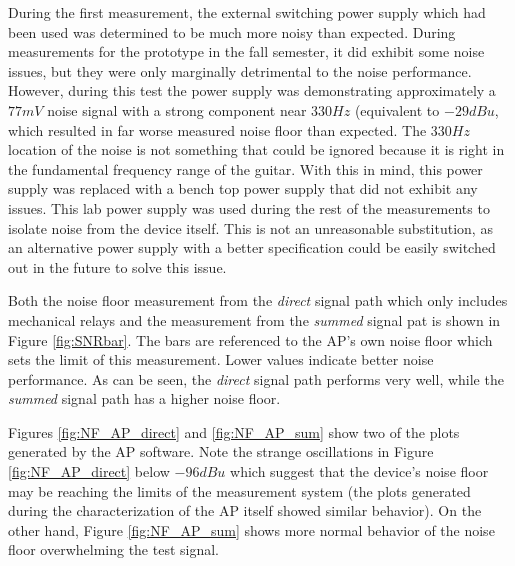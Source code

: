		During the first measurement, the external switching power supply which had been used was determined to be much more noisy than expected.  During measurements for the prototype in the fall semester, it did exhibit some noise issues, but they were only marginally detrimental to the noise performance.  However, during this test the power supply was demonstrating approximately a $77mV$ noise signal with a strong component near $330Hz$ (equivalent to $-29 dBu$, which resulted in far worse measured noise floor than expected.  The $330Hz$ location of the noise is not something that could be ignored because it is right in the fundamental frequency range of the guitar.  With this in mind, this power supply was replaced with a bench top power supply that did not exhibit any issues.  This lab power supply was used during the rest of the measurements to isolate noise from the device itself.  This is not an unreasonable substitution, as an alternative power supply with a better specification could be easily switched out in the future to solve this issue.

		Both the noise floor measurement from the \emph{direct} signal path which only includes mechanical relays and the measurement from the \emph{summed} signal pat is shown in Figure \ref{fig:SNRbar}.  The bars are referenced to the AP's own noise floor which sets the limit of this measurement.  Lower values indicate better noise performance.  As can be seen, the \emph{direct} signal path performs very well, while the \emph{summed} signal path has a higher noise floor.

		Figures \ref{fig:NF_AP_direct} and \ref{fig:NF_AP_sum} show two of the plots generated by the AP software.  Note the strange oscillations in Figure \ref{fig:NF_AP_direct} below $-96dBu$ which suggest that the device's noise floor may be reaching the limits of the measurement system (the plots generated during the characterization of the AP itself showed similar behavior).  On the other hand, Figure \ref{fig:NF_AP_sum} shows more normal behavior of the noise floor overwhelming the test signal.



